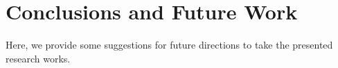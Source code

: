 \chapter{Conclusions and Future Work}

Here, we provide some suggestions for future directions to take the presented research works.